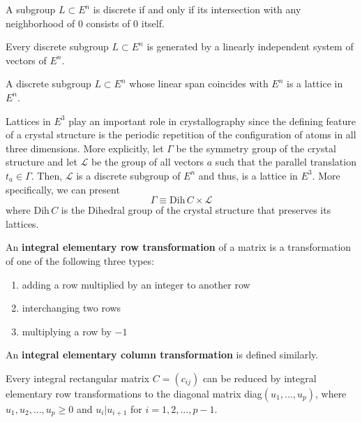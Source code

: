 \documentclass{article}
\begin{document}
    \begin{proposition}
      A subgroup $L \subset E^n$ is discrete if and only if its intersection with any neighborhood of $0$ consists of $0$ itself. 
    \end{proposition}

    \begin{theorem}
      Every discrete subgroup $L \subset E^n$ is generated by a linearly independent system of vectors of $E^n$. 
    \end{theorem}

    \begin{corollary}
      A discrete subgroup $L \subset E^n$ whose linear span coincides with $E^n$ is a lattice in $E^n$. 
    \end{corollary}

    Lattices in $E^3$ play an important role in crystallography since the defining feature of a crystal structure is the periodic repetition of the configuration of atoms in all three dimensions. More explicitly, let $\Gamma$ be the symmetry group of the crystal structure and let $\mathcal{L}$ be the group of all vectors $a$ such that the parallel translation $t_a \in \Gamma$. Then, $\mathcal{L}$ is a discrete subgroup of $E^n$ and thus, is a lattice in $E^3$. More specifically, we can present 
    \begin{equation}
      \Gamma \equiv \text{Dih}\,C \times \mathcal{L}
    \end{equation}
    where Dih$\, C$ is the Dihedral group of the crystal structure that preserves its lattices. 

    \begin{definition}
      An \textbf{integral elementary row transformation} of a matrix is a transformation of one of the following three types: 
      \begin{enumerate}
        \item adding a row multiplied by an integer to another row
        \item interchanging two rows
        \item multiplying a row by $-1$ 
      \end{enumerate}
      An \textbf{integral elementary column transformation} is defined similarly. 
    \end{definition}

    \begin{proposition}
      Every integral rectangular matrix $C = (c_{i j})$ can be reduced by integral elementary row transformations to the diagonal matrix diag$(u_1, ..., u_p)$, where $u_1, u_2, ..., u_p \geq 0$ and $u_i | u_{i+1}$ for $i = 1, 2, ..., p -1$. 
    \end{proposition}
\end{document}
